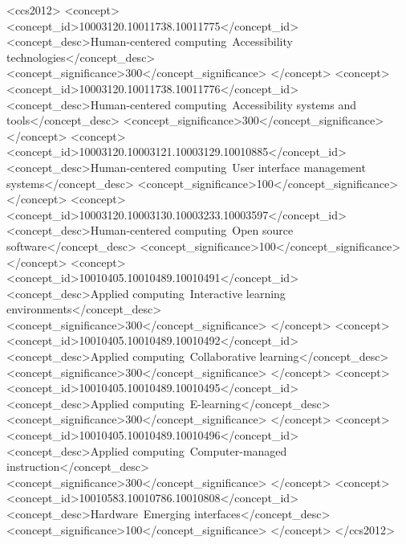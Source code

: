 \documentclass[sigconf]{acmart}
\begin{document}
\begin{CCSXML}
<ccs2012>
<concept>
<concept_id>10003120.10011738.10011775</concept_id>
<concept_desc>Human-centered computing~Accessibility technologies</concept_desc>
<concept_significance>300</concept_significance>
</concept>
<concept>
<concept_id>10003120.10011738.10011776</concept_id>
<concept_desc>Human-centered computing~Accessibility systems and tools</concept_desc>
<concept_significance>300</concept_significance>
</concept>
<concept>
<concept_id>10003120.10003121.10003129.10010885</concept_id>
<concept_desc>Human-centered computing~User interface management systems</concept_desc>
<concept_significance>100</concept_significance>
</concept>
<concept>
<concept_id>10003120.10003130.10003233.10003597</concept_id>
<concept_desc>Human-centered computing~Open source software</concept_desc>
<concept_significance>100</concept_significance>
</concept>
<concept>
<concept_id>10010405.10010489.10010491</concept_id>
<concept_desc>Applied computing~Interactive learning environments</concept_desc>
<concept_significance>300</concept_significance>
</concept>
<concept>
<concept_id>10010405.10010489.10010492</concept_id>
<concept_desc>Applied computing~Collaborative learning</concept_desc>
<concept_significance>300</concept_significance>
</concept>
<concept>
<concept_id>10010405.10010489.10010495</concept_id>
<concept_desc>Applied computing~E-learning</concept_desc>
<concept_significance>300</concept_significance>
</concept>
<concept>
<concept_id>10010405.10010489.10010496</concept_id>
<concept_desc>Applied computing~Computer-managed instruction</concept_desc>
<concept_significance>300</concept_significance>
</concept>
<concept>
<concept_id>10010583.10010786.10010808</concept_id>
<concept_desc>Hardware~Emerging interfaces</concept_desc>
<concept_significance>100</concept_significance>
</concept>
</ccs2012>
\end{CCSXML}




\maketitle





\end{document}
